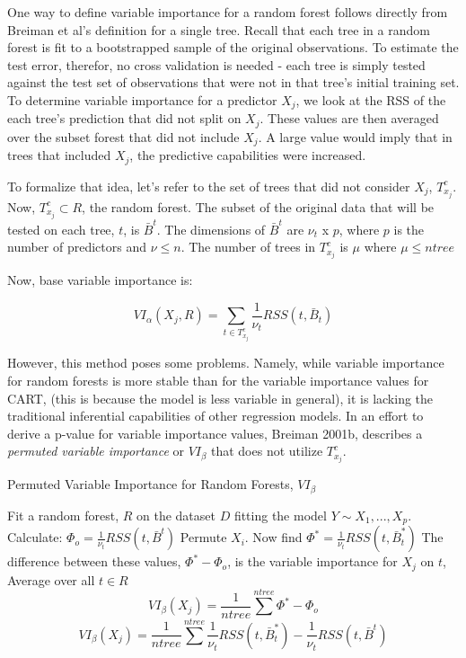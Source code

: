 \documentclass[12pt,twoside]{reedthesis}
\begin{document}
  One way to define variable importance for a random forest follows
  directly from Breiman et al's definition for a single tree. Recall that
  each tree in a random forest is fit to a bootstrapped sample of the
  original observations. To estimate the test error, therefor, no cross
  validation is needed - each tree is simply tested against the test set
  of observations that were not in that tree's initial training set. To
  determine variable importance for a predictor \(X_j\), we look at the
  RSS of the each tree's prediction that did not split on \(X_j\). These
  values are then averaged over the subset forest that did not include
  \(X_j\). A large value would imply that in trees that included \(X_j\),
  the predictive capabilities were increased.
  
  To formalize that idea, let's refer to the set of trees that did not
  consider \(X_j\), \(T_{x_j}^c\). Now, \(T_{x_j}^c \subset R\), the
  random forest. The subset of the original data that will be tested on
  each tree, \(t\), is \(\bar{B}^t\). The dimensions of \(\bar{B}^t\) are
  \(\nu_t\) x \(p\), where \(p\) is the number of predictors and
  \(\nu \leq n\). The number of trees in \(T_{x_j}^c\) is \(\mu\) where
  \(\mu \leq ntree\)
  
  Now, base variable importance is:
  
  \[VI_{\alpha}(X_j, R) =  \sum_{t \in T_{x_j}^c} \frac 1 {\nu_t} RSS(t,\bar{B}_t)\]
  
  However, this method poses some problems. Namely, while variable
  importance for random forests is more stable than for the variable
  importance values for CART, (this is because the model is less variable
  in general), it is lacking the traditional inferential capabilities of
  other regression models. In an effort to derive a p-value for variable
  importance values, Breiman 2001b, describes a \emph{permuted variable
  importance} or \(VI_{\beta}\) that does not utilize \(T_{x_j}^c\).
  
  \begin{algorithm}
  \caption{Permuted Variable Importance for Random Forests, $VI_{\beta}$}
  \label{breiman}
  \begin{algorithmic}
  \State Fit a random forest, $R$ on the dataset $D$ fitting the model $Y \sim X_1,...,X_p$.
  \State Calculate: $\Phi_o =  \frac 1 {\nu_t} RSS(t,\bar{B}^t)$
  \State Permute $X_i$. Now find $\Phi^* =  \frac 1 {\nu_t} RSS(t,\bar{B}_t^*)$
  \State The difference between these values, $\Phi^* - \Phi_o$,  is the variable importance for $X_j$ on $t$,  
  \EndFor
  \State Average over all $t \in R$ 
   $$VI_{\beta}(X_j) = \frac 1 {ntree} \sum^{ntree} \Phi^* - \Phi_o$$
   $$VI_{\beta}(X_j) = \frac 1 {ntree} \sum^{ntree} \frac 1 {\nu_t} RSS(t,\bar{B}_t^*) - \frac 1 {\nu_t} RSS(t,\bar{B}^t)$$
  \EndFor
  \end{algorithmic}
  \end{algorithm}
  
\end{document}
